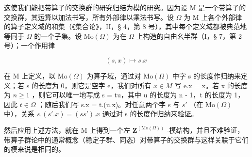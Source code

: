 这使我们能把带算子的交换群的研究归结为模的研究。因为设 M 是一个带算子的交换群，其运算以加法书写，所有外部律以乘法书写。设 \(\Omega\) 为 M 上各个外部律的算子定义域的和集（《集合论》，II，§ 4，第 8 号），其中每个定义域都被典范地等同于 \(\Omega\) 的一个子集。设 \(\mathrm{Mo}(\Omega)\) 为在 \(\Omega\) 上构造的自由幺半群（I，§ 7，第 2 号）；一个作用律

\[
(s, x) \mapsto s. x
\]

在 M 上定义，以 \(\mathrm{Mo}(\Omega)\) 为算子域，通过对 \(\mathrm{Mo}(\Omega)\) 中字 s 的长度作归纳来定义；若 s 的长度为 0，则它是空字 e，我们对所有 \(x \in M\) 写 e.x = x。若 x 的长度为 \(n \geqslant 1\) ，则它可以唯一地写成 s = tu，其中 u 的长度为 n - 1，t 的长度为 1，因此 \(t \in \Omega\) ；随后我们写 s.x = t.(u.x)。对任意两个字 s 与 \(s'\) （在 \(\mathrm{Mo}(\Omega)\) 中），关系 \(s.(s'.x) = (ss').x\) 通过对 s 的长度作归纳来验证。

然后应用上述方法，就在 M 上得到一个左 \(\mathbf{Z}^{(\mathrm{Mo}(\Omega))}\) -模结构，并且不难验证，带算子群论中的通常概念（稳定子群、同态）对带算子的交换群与这样关联于它们的模来说是相同的。

